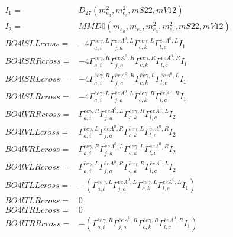 \documentclass[A4,landscape]{article}
\begin{document}
\begin{align} 
I_1 = & D_{27}(m^2_{e_{{a}}}, m^2_{e_{{c}}}, mS22, mV12) \\ 
I_2 = & MMD0(m_{e_{{a}}}, m_{e_{{c}}}, m^2_{e_{{a}}}, m^2_{e_{{c}}}, mS22, mV12) \\ 
  BO4lSLLcross= & -4  \Gamma^{\bar{e}e \gamma ,L}_{a, i} \Gamma^{\bar{e}e A^0 ,L}_{j, a} \Gamma^{\bar{e}e \gamma ,L}_{c, k} \Gamma^{\bar{e}e A^0 ,L}_{l, c} I_1 \\ 
  BO4lSRRcross= & -4  \Gamma^{\bar{e}e \gamma ,R}_{a, i} \Gamma^{\bar{e}e A^0 ,R}_{j, a} \Gamma^{\bar{e}e \gamma ,R}_{c, k} \Gamma^{\bar{e}e A^0 ,R}_{l, c} I_1 \\ 
  BO4lSRLcross= & -4  \Gamma^{\bar{e}e \gamma ,R}_{a, i} \Gamma^{\bar{e}e A^0 ,R}_{j, a} \Gamma^{\bar{e}e \gamma ,L}_{c, k} \Gamma^{\bar{e}e A^0 ,L}_{l, c} I_1 \\ 
  BO4lSLRcross= & -4  \Gamma^{\bar{e}e \gamma ,L}_{a, i} \Gamma^{\bar{e}e A^0 ,L}_{j, a} \Gamma^{\bar{e}e \gamma ,R}_{c, k} \Gamma^{\bar{e}e A^0 ,R}_{l, c} I_1 \\ 
  BO4lVRRcross= &  \Gamma^{\bar{e}e \gamma ,R}_{a, i} \Gamma^{\bar{e}e A^0 ,L}_{j, a} \Gamma^{\bar{e}e \gamma ,R}_{c, k} \Gamma^{\bar{e}e A^0 ,L}_{l, c} I_2 \\ 
  BO4lVLLcross= &  \Gamma^{\bar{e}e \gamma ,L}_{a, i} \Gamma^{\bar{e}e A^0 ,R}_{j, a} \Gamma^{\bar{e}e \gamma ,L}_{c, k} \Gamma^{\bar{e}e A^0 ,R}_{l, c} I_2 \\ 
  BO4lVRLcross= &  \Gamma^{\bar{e}e \gamma ,R}_{a, i} \Gamma^{\bar{e}e A^0 ,L}_{j, a} \Gamma^{\bar{e}e \gamma ,L}_{c, k} \Gamma^{\bar{e}e A^0 ,R}_{l, c} I_2 \\ 
  BO4lVLRcross= &  \Gamma^{\bar{e}e \gamma ,L}_{a, i} \Gamma^{\bar{e}e A^0 ,R}_{j, a} \Gamma^{\bar{e}e \gamma ,R}_{c, k} \Gamma^{\bar{e}e A^0 ,L}_{l, c} I_2 \\ 
  BO4lTLLcross= & -( \Gamma^{\bar{e}e \gamma ,L}_{a, i} \Gamma^{\bar{e}e A^0 ,L}_{j, a} \Gamma^{\bar{e}e \gamma ,L}_{c, k} \Gamma^{\bar{e}e A^0 ,L}_{l, c} I_1) \\ 
  BO4lTLRcross= & 0 \\ 
  BO4lTRLcross= & 0 \\ 
  BO4lTRRcross= & -( \Gamma^{\bar{e}e \gamma ,R}_{a, i} \Gamma^{\bar{e}e A^0 ,R}_{j, a} \Gamma^{\bar{e}e \gamma ,R}_{c, k} \Gamma^{\bar{e}e A^0 ,R}_{l, c} I_1) \\ 
\end{align} 
\end{document}
